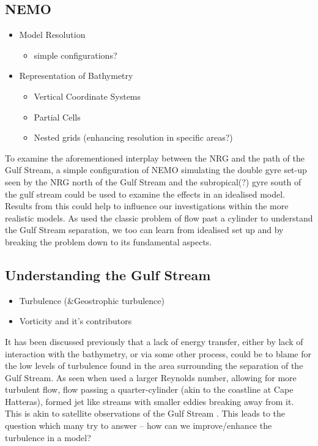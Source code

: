 \documentclass[a4paper,11pt]{article}
\begin{document}
\subsection{NEMO}
\begin{itemize}
  \item Model Resolution \citep{Ezer2016b}
  \begin{itemize}
    \item simple configurations? \citep{Tansley2001}
  \end{itemize}
  \item Representation of Bathymetry
  \begin{itemize}
    \item Vertical Coordinate Systems
    \item Partial Cells
    \item Nested grids (enhancing resolution in specific areas?) 
  \end{itemize}
\end{itemize}

To examine the aforementioned interplay between the NRG and the path of the Gulf Stream, a simple configuration of NEMO simulating the double gyre set-up seen by the NRG north of the Gulf Stream and the subropical(?) gyre south of the gulf stream could be used to examine the effects in an idealised model. Results from this could help to influence our investigations within the more realistic models. As \citep{Tansley2001} used the classic problem of flow past a cylinder to understand the Gulf Stream separation, we too can learn from idealised set up and by breaking the problem down to its fundamental aspects.

\subsection{Understanding the Gulf Stream}
\begin{itemize}
  \item Turbulence    (\&Geostrophic turbulence)
  \item Vorticity and it's contributors
\end{itemize}
  
It has been discussed previously  that a lack of energy transfer, either by lack of interaction with the bathymetry, or via some other process, could be to blame for the low levels of turbulence found in the area surrounding the separation of the Gulf Stream. As seen when \citep{Tansley2001} used a larger Reynolds number, allowing for more turbulent flow, flow passing a quarter-cylinder (akin to the coastline at Cape Hatteras), formed jet like streams with smaller eddies breaking away  from it. This is akin to satellite observations of the Gulf Stream . This leads to the question which many try to answer – how can we improve/enhance the turbulence in a model?   
  
\end{document}
